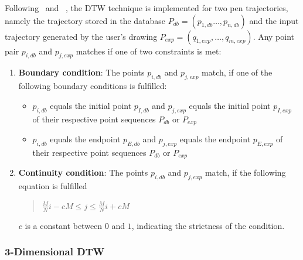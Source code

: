 Following~ \citeyear{Vuori2001} 
and~ \citeyear{Niels2005}, 
the DTW technique is implemented for two pen trajectories, 
namely the trajectory stored in the database 
\(P_{db} = (p_{1,db}\ldots,p_{n,db})\) and the input trajectory generated by
the user's drawing \(P_{exp} = (q_{1,exp},\ldots,q_{m,exp})\).
Any point pair \(p_{i,db}\) and \(p_{j,exp}\) matches if one of two constraints 
is met:
\begin{enumerate}
  \item \textbf{Boundary condition}: The points \(p_{i,db}\) and \(p_{j,exp}\)  
         match, if one of the following boundary conditions is fulfilled:
        \begin{itemize}
          \item \(p_{i,db}\) equals the initial point \(p_{I,db} \) 
                and \(p_{j,exp}\) equals the initial point \(p_{I,exp}\)
                of their respective point sequences \(P_{db}\) or \(P_{exp}\)

          \item \(p_{i,db}\) equals the endpoint \(p_{E,db} \) 
                and \(p_{j,exp}\) equals the endpoint \(p_{E,exp}\)
                of their respective point sequences \(P_{db}\) or \(P_{exp}\)
        \end{itemize}

  \item \textbf{Continuity condition}: The points \(p_{i,db}\) and \(p_{j,exp}\)  
         match, if the following equation is fulfilled \\
         \begin{quote}
         \(
            \frac{M}{N}i - cM \le j \le \frac{M}{N}i + cM
         \)
         \end{quote}
         \(c\) is a constant between \(0\) and \(1\), indicating the 
         strictness of the condition.
\end{enumerate}

\subsubsection{3-Dimensional DTW}
\label{sec:hwre:3ddtw}

